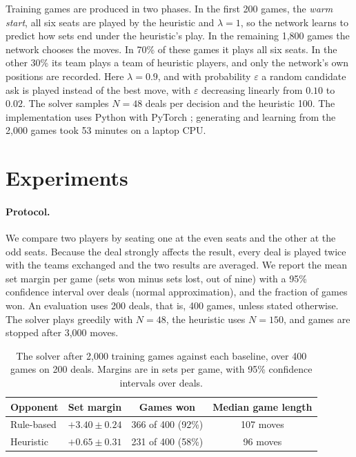\documentclass{article}
\begin{document}
Training games are produced in two phases.  In the first 200 games, the
\emph{warm start}, all six seats are played by the heuristic and $\lambda = 1$,
so the network learns to predict how sets end under the heuristic's play.  In
the remaining 1,800 games the network chooses the moves.  In 70\% of these
games it plays all six seats.  In the other 30\% its team plays a team of
heuristic players, and only the network's own positions are recorded.  Here
$\lambda = 0.9$, and with probability $\varepsilon$ a random candidate ask is
played instead of the best move, with $\varepsilon$ decreasing linearly from
$0.10$ to $0.02$.  The solver samples $N = 48$ deals per decision and the
heuristic 100.  The implementation uses Python with PyTorch
\citep{paszke2019}; generating and learning from the 2,000 games took 53
minutes on a laptop CPU.

\section{Experiments}
\label{sec:experiments}

\paragraph{Protocol.}
We compare two players by seating one at the even seats and the other at the
odd seats.  Because the deal strongly affects the result, every deal is played
twice with the teams exchanged and the two results are averaged.  We report the
mean set margin per game (sets won minus sets lost, out of nine) with a 95\%
confidence interval over deals (normal approximation), and the fraction of
games won.  An evaluation uses 200 deals, that is, 400 games, unless stated
otherwise.  The solver plays greedily with $N = 48$, the heuristic uses
$N = 150$, and games are stopped after 3,000 moves.

\begin{table}[t]
  \caption{The solver after 2,000 training games against each baseline, over
    400 games on 200 deals.  Margins are in sets per game, with 95\% confidence
    intervals over deals.}
  \label{tab:main}
  \centering
  \begin{tabular}{lccc}
    \toprule
    Opponent & Set margin & Games won & Median game length \\
    \midrule
    Rule-based & $+3.40 \pm 0.24$ & 366 of 400 (92\%) & 107 moves \\
    Heuristic  & $+0.65 \pm 0.31$ & 231 of 400 (58\%) & 96 moves \\
    \bottomrule
  \end{tabular}
\end{table}
\end{document}
